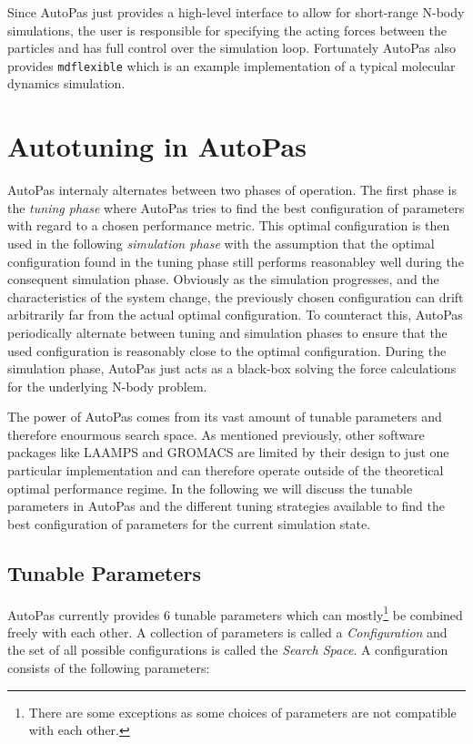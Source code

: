 Since AutoPas just provides a high-level interface to allow for short-range N-body simulations, the user is responsible for specifying the acting forces between the particles and has full control over the simulation loop. Fortunately AutoPas also provides \texttt{\gls{mdflexible}} which is an example implementation of a typical molecular dynamics simulation.

\section{Autotuning in AutoPas}

AutoPas internaly alternates between two phases of operation. The first phase is the \emph{tuning phase} where AutoPas tries to find the best configuration of parameters with regard to a chosen performance metric. This optimal configuration is then used in the following \emph{simulation phase} with the assumption that the optimal configuration found in the tuning phase still performs reasonabley well during the consequent simulation phase. Obviously as the simulation progresses, and the characteristics of the system change, the previously chosen configuration can drift arbitrarily far from the actual optimal configuration. To counteract this, AutoPas periodically alternate between tuning and simulation phases to ensure that the used configuration is reasonably close to the optimal configuration.
During the simulation phase, AutoPas just acts as a black-box solving the force calculations for the underlying N-body problem.


The power of AutoPas comes from its vast amount of tunable parameters and therefore enourmous search space. As mentioned previously, other software packages like LAAMPS and GROMACS are limited by their design to just one particular implementation and can therefore operate outside of the theoretical
optimal performance regime. In the following we will discuss the tunable parameters in AutoPas and the different tuning strategies available to find the best configuration of parameters for the current simulation state.


\subsection*{Tunable Parameters}

AutoPas currently provides 6 tunable parameters which can mostly\footnote{There are some exceptions as some choices of parameters are not compatible with each other.} be combined freely with each other. A collection of parameters is called a \emph{Configuration} and the set of all possible configurations is called the \emph{Search Space}. A configuration consists of the following parameters:

